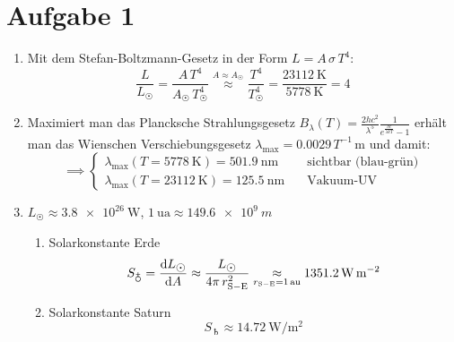 \documentclass[11pt,a4paper]{scrartcl}
\newcommand{\Lum}{{L}}
\newcommand{\Area}{{A}}
\newcommand{\Temp}{{T}}
\newcommand{\lambdamax}{\lambda_{\mathrm{max}}}
\begin{document}
\section*{Aufgabe 1}

\begin{enumerate}[label=\textbf{\large(\alph*)}]

\item
    Mit dem Stefan-Boltzmann-Gesetz in der Form $\Lum = \Area\,\sigma\,\Temp^4$:
    \begin{equation*}
        \frac{\Lum}{\Lum_{\astrosun}} =
        \frac{\Area\,\Temp^4}{\Area_{\astrosun}\,\Temp_{\astrosun}^4}
        \overset{\Area\approx\Area_{\astrosun}}{\approx}
        \frac{\Temp^4}{\Temp_{\astrosun}^4} =
        \frac{\SI{23112}{\kelvin}}{\SI{5778}{\kelvin}} = 4
    \end{equation*}

\vspace*{\baselineskip}

\item
    Maximiert man das Plancksche Strahlungsgesetz $B_{\lambda}(T) =
    \frac{2hc^2}{\lambda^5}\frac{1}{e^{\frac{hc}{\lambda kT}}-1}$ erhält man
    das Wienschen Verschiebungsgesetz $\lambdamax =
    0.0029\,\Temp^{-1}\,\si{\metre}$ und damit:
    \begin{equation*}
        \implies
        \begin{cases}
            \lambdamax(\Temp=\SI{5778}{\kelvin}) = \SI{501.9}{\nano\metre} &
            \quad \textrm{sichtbar (blau-grün)} \\
            \lambdamax(\Temp=\SI{23112}{\kelvin}) = \SI{125.5}{\nano\metre} &
            \quad \textrm{Vakuum-UV}
        \end{cases}
    \end{equation*}

\vspace*{\baselineskip}

\item
    $\Lum_{\astrosun}\approx\SI{3.8e26}{\watt}$,
    $\SI{1}{\astronomicalunit}\approx\SI{149.6e9}{m}$
    \begin{enumerate}[label=\textbf{(\roman*)}]
        \item Solarkonstante Erde
            \begin{equation*}
                S_{\earth} = \dv{\Lum_{\astrosun}}{\Area} \approx
                \frac{\Lum_{\astrosun}}{4\pi\,r_{\mathrm{S-E}}^2}
                \underset{r_{\mathrm{S-E}}=\SI{1}{\astronomicalunit}}{\approx}
                \SI{1351.2}{\watt\per\metre\squared}
            \end{equation*}

        \item Solarkonstante Saturn
            \begin{equation*}
                S_{\saturn} \approx
                \SI{14.72}{\watt\per\metre\squared}
            \end{equation*}
    \end{enumerate}


\end{enumerate}
\end{document}

